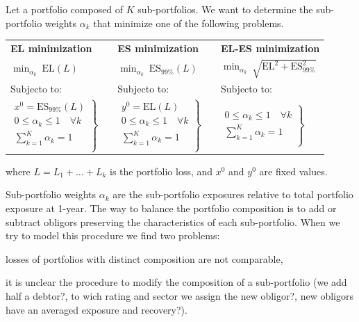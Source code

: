 \documentclass[11pt,fleqn]{book} %
\begin{document}
\begin{definition}
	Let a portfolio composed of $K$ sub-portfolios. We want to determine the 
	sub-portfolio weights $\alpha_k$ that minimize one of the following 
	problems\footnotemark[1].

	{\centering
	\renewcommand{\arraystretch}{1.5}
	\begin{tabular}{l m{1cm} l m{1cm} l}
		\textbf{EL minimization} & & \textbf{ES minimization} & & \textbf{EL-ES minimization} 
		\\
		$\displaystyle \min_{\alpha_k} \ \text{EL}(L)$
		& &
		$\displaystyle \min_{\alpha_k} \ \text{ES}_{99\%}(L)$
		& &
		$\displaystyle \min_{\alpha_k} \ \sqrt{\text{EL}^2+\text{ES}_{99\%}^2}$
		\\
		Subjecto to:
		& &
		Subjecto to:
		& &
		Subjecto to:
		\\
		$\left.
			\begin{array}{l}
				x^0 = \text{ES}_{99\%}(L) \\
				0 \le \alpha_k \le 1 \quad \forall k \\
				\displaystyle \sum_{k=1}^{K} \alpha_k = 1 \\
			\end{array}
			\right\}
		$
		& &
		$\left.
			\begin{array}{l}
				y^0 = \text{EL}(L) \\
				0 \le \alpha_k \le 1 \quad \forall k \\
				\displaystyle \sum_{k=1}^{K} \alpha_k = 1 \\
			\end{array}
			\right\}
		$
		& &
		$\left.
			\begin{array}{l}
				\\
				0 \le \alpha_k \le 1 \quad \forall k \\
				\displaystyle \sum_{k=1}^{K} \alpha_k = 1 \\
			\end{array}
			\right\}
		$
	\end{tabular}\par}
	where $L=L_1+\dots+L_k$ is the portfolio loss, and $x^0$ and $y^0$ are 
	fixed values.
\end{definition}


Sub-portfolio weights $\alpha_k$ are the sub-portfolio exposures relative 
to total portfolio exposure at 1-year. The way to balance the portfolio 
composition is to add or subtract obligors preserving the characteristics 
of each sub-portfolio. When we try to model this procedure we find two 
problems:
\begin{inparaenum}[1)]
	\item losses of portfolios with distinct composition are not comparable, 
	\item it is unclear the procedure to modify the composition of a 
		sub-portfolio (we add half a debtor?, to wich rating and sector we 
		assign the new obligor?, new obligors have an averaged exposure and 
		recovery?).
\end{inparaenum}
\end{document}
